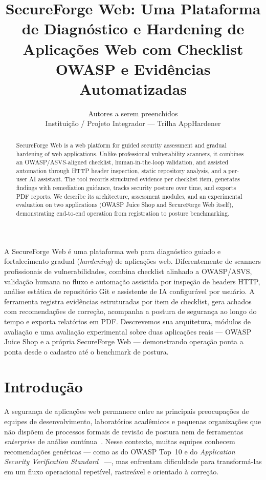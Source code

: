 \documentclass[12pt]{article}
\title{SecureForge Web: Uma Plataforma de Diagnóstico e Hardening de Aplicações Web com Checklist OWASP e Evidências Automatizadas}
\author{
  Autores a serem preenchidos\\
  Instituição / Projeto Integrador --- Trilha AppHardener\\
  \email{contato@exemplo.edu.br}
}
\begin{document}
\maketitle

\begin{abstract}
SecureForge Web is a web platform for guided security assessment and gradual hardening of web applications. Unlike professional vulnerability scanners, it combines an OWASP/ASVS-aligned checklist, human-in-the-loop validation, and assisted automation through HTTP header inspection, static repository analysis, and a per-user AI assistant. The tool records structured evidence per checklist item, generates findings with remediation guidance, tracks security posture over time, and exports PDF reports. We describe its architecture, assessment modules, and an experimental evaluation on two applications (OWASP Juice Shop and SecureForge Web itself), demonstrating end-to-end operation from registration to posture benchmarking.
\end{abstract}

\begin{resumo}
A SecureForge Web é uma plataforma web para diagnóstico guiado e fortalecimento gradual (\emph{hardening}) de aplicações web. Diferentemente de scanners profissionais de vulnerabilidades, combina checklist alinhado a OWASP/ASVS, validação humana no fluxo e automação assistida por inspeção de headers HTTP, análise estática de repositório Git e assistente de IA configurável por usuário. A ferramenta registra evidências estruturadas por item de checklist, gera achados com recomendações de correção, acompanha a postura de segurança ao longo do tempo e exporta relatórios em PDF. Descrevemos sua arquitetura, módulos de avaliação e uma avaliação experimental sobre duas aplicações reais --- OWASP Juice Shop e a própria SecureForge Web --- demonstrando operação ponta a ponta desde o cadastro até o benchmark de postura.
\end{resumo}

\section{Introdução}
A segurança de aplicações web permanece entre as principais preocupações de equipes de desenvolvimento, laboratórios acadêmicos e pequenas organizações que não dispõem de processos formais de revisão de postura nem de ferramentas \emph{enterprise} de análise contínua~\cite{owasp-samm}. Nesse contexto, muitas equipes conhecem recomendações genéricas --- como as do OWASP Top~10 e do \emph{Application Security Verification Standard}~\cite{owasp-asvs-2021} ---, mas enfrentam dificuldade para transformá-las em um fluxo operacional repetível, rastreável e orientado à correção.
\end{document}

